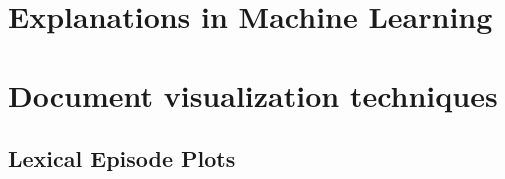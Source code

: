 \documentclass{l4proj}
\begin{document}
\section{Explanations in Machine Learning}


\autocite{ribeiroWhyShouldTrust2016}

\autocite{lundbergUnifiedApproachInterpreting2017}

\section{Document visualization techniques}

\subsection{Lexical Episode Plots}
%
\begin{figure}
    \centering
    \begin{subfigure}[c]{0.2\textwidth}
        \centering
        \small

\end{subfigure}
\end{figure}
\end{document}
